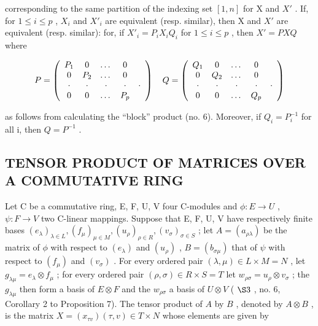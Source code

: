 corresponding to the same partition of the indexing set \([1, n]\) for X and \(X'\) . If, for \(1 \leqslant i \leqslant p\) , \(X_i\) and \(X'_i\) are equivalent (resp. similar), then X and \(X'\) are equivalent (resp. similar): for, if \(X'_i = P_i X_i Q_i\) for \(1 \leqslant i \leqslant p\) , then \(X' = PXQ\) where

\[
P = \left( \begin{array}{c c c c c} P _ {1} & 0 & \dots & 0 \\ 0 & P _ {2} & \dots & 0 \\ \cdot & \cdot & \cdot & \cdot & \cdot \\ 0 & 0 & \dots & P _ {p} \end{array} \right) \quad Q = \left( \begin{array}{c c c c c} Q _ {1} & 0 & \dots & 0 \\ 0 & Q _ {2} & \dots & 0 \\ \cdot & \cdot & \cdot & \cdot & \cdot \\ 0 & 0 & \dots & Q _ {p} \end{array} \right)
\]

as follows from calculating the ``block'' product (no. 6). Moreover, if \(Q_{i} = P_{i}^{-1}\) for all i, then \(Q = P^{-1}\) .

\subsection{TENSOR PRODUCT OF MATRICES OVER A COMMUTATIVE RING}

Let C be a commutative ring, E, F, U, V four C-modules and \(\phi:E\to U\) , \(\psi:F\to V\) two C-linear mappings. Suppose that E, F, U, V have respectively finite bases \((e_{\lambda})_{\lambda \in L}, (f_{\mu})_{\mu \in M}, (u_{\rho})_{\rho \in R}, (v_{\sigma})_{\sigma \in S}\) ; let \(A = (a_{\rho \lambda})\) be the matrix of \(\phi\) with respect to \((e_{\lambda})\) and \((u_{\rho})\) , \(B = (b_{\sigma \mu})\) that of \(\psi\) with respect to \((f_{\mu})\) and \((v_{\sigma})\) . For every ordered pair \((\lambda, \mu) \in L \times M = N\) , let \(g_{\lambda \mu} = e_{\lambda} \otimes f_{\mu}\) ; for every ordered pair \((\rho, \sigma) \in R \times S = T\) let \(w_{\rho \sigma} = u_{\rho} \otimes v_{\sigma}\) ; the \(g_{\lambda \mu}\) then form a basis of \(E \otimes F\) and the \(w_{\rho \sigma}\) a basis of \(U \otimes V\) ( \(\S 3\) , no. 6, Corollary 2 to Proposition 7). The tensor product of \(A\) by \(B\) , denoted by \(A \otimes B\) , is the matrix \(X = (x_{\tau v})(\tau, v) \in T \times N\) whose elements are given by

